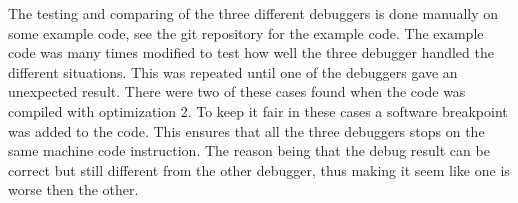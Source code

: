 %
%
%
%
%
%


%


The testing and comparing of the three different debuggers is done manually on some example code, see the git repository \cite{example-code} for the example code.
The example code was many times modified to test how well the three debugger handled the different situations.
This was repeated until one of the debuggers gave an unexpected result.
There were two of these cases found when the code was compiled with optimization 2.
To keep it fair in these cases a software breakpoint was added to the code.
This ensures that all the three debuggers stops on the same machine code instruction.
The reason being that the debug result can be correct but still different from the other debugger, thus making it seem like one is worse then the other.


